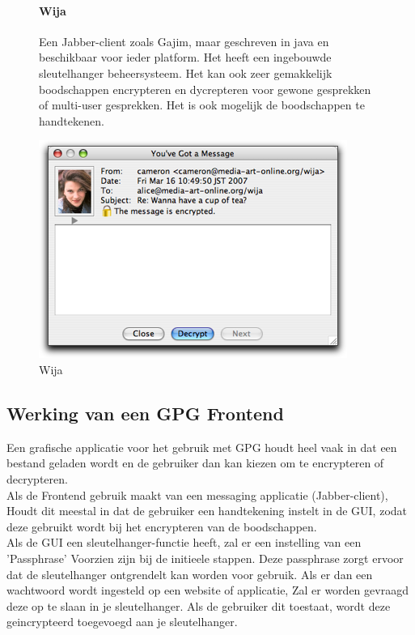 \documentclass[12pt]{article}
\begin{document}
				\begin{figure}[!ht]				
					\paragraph{Wija}
						Een Jabber-client zoals Gajim, maar geschreven in java en beschikbaar voor 								ieder platform.
						Het heeft een ingebouwde sleutelhanger beheersysteem. Het kan ook zeer 									gemakkelijk boodschappen encrypteren en dycrepteren voor gewone gesprekken of 							multi-user gesprekken.
						Het is ook mogelijk de boodschappen te handtekenen.
					\begin{center}
						\includegraphics[scale=0.7]{Pictures/wija}
					\end{center}
					\caption{Wija}
				\end{figure}
				
		\subsection{Werking van een GPG Frontend}\label{Frontend}
			Een grafische applicatie voor het gebruik met GPG houdt heel vaak in dat een bestand
			geladen wordt en de gebruiker dan kan kiezen om te encrypteren of decrypteren.\\
			Als de Frontend gebruik maakt van een messaging applicatie (Jabber-client),
			Houdt dit meestal in dat de gebruiker een handtekening instelt in de GUI,
			zodat deze gebruikt wordt bij het encrypteren van de boodschappen.\\
			Als de GUI een sleutelhanger-functie heeft, zal er een instelling van een 'Passphrase'
			Voorzien zijn bij de initieele stappen. Deze passphrase zorgt ervoor dat de sleutelhanger
			ontgrendelt kan worden voor gebruik. Als er dan een wachtwoord wordt ingesteld op een
			website of applicatie, Zal er worden gevraagd deze op te slaan in je sleutelhanger.
			Als de gebruiker dit toestaat, wordt deze geincrypteerd toegevoegd aan je sleutelhanger.
						
\end{document}
